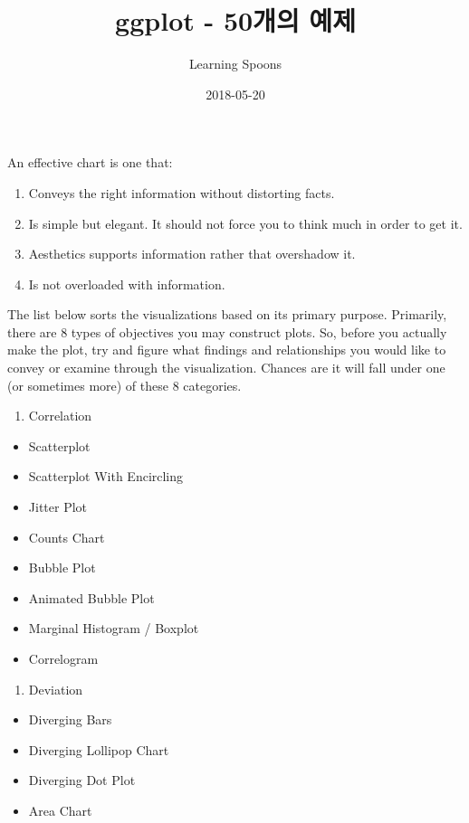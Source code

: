 \documentclass[a4paper]{article}
\title{ggplot - 50개의 예제}
\author{Learning Spoons}
\date{2018-05-20}
\providecommand{\tightlist}{%
  \setlength{\itemsep}{0pt}\setlength{\parskip}{0pt}}
\begin{document}
\maketitle

An effective chart is one that:

\begin{enumerate}
\def\labelenumi{\arabic{enumi}.}
\tightlist
\item
  Conveys the right information without distorting facts.
\item
  Is simple but elegant. It should not force you to think much in order
  to get it.
\item
  Aesthetics supports information rather that overshadow it.
\item
  Is not overloaded with information.
\end{enumerate}

The list below sorts the visualizations based on its primary purpose.
Primarily, there are 8 types of objectives you may construct plots. So,
before you actually make the plot, try and figure what findings and
relationships you would like to convey or examine through the
visualization. Chances are it will fall under one (or sometimes more) of
these 8 categories.

\begin{enumerate}
\def\labelenumi{\arabic{enumi}.}
\tightlist
\item
  Correlation
\end{enumerate}

\begin{itemize}
\tightlist
\item
  Scatterplot
\item
  Scatterplot With Encircling
\item
  Jitter Plot
\item
  Counts Chart
\item
  Bubble Plot
\item
  Animated Bubble Plot
\item
  Marginal Histogram / Boxplot
\item
  Correlogram
\end{itemize}

\begin{enumerate}
\def\labelenumi{\arabic{enumi}.}
\setcounter{enumi}{1}
\tightlist
\item
  Deviation
\end{enumerate}

\begin{itemize}
\tightlist
\item
  Diverging Bars
\item
  Diverging Lollipop Chart
\item
  Diverging Dot Plot
\item
  Area Chart
\end{itemize}
\end{document}
